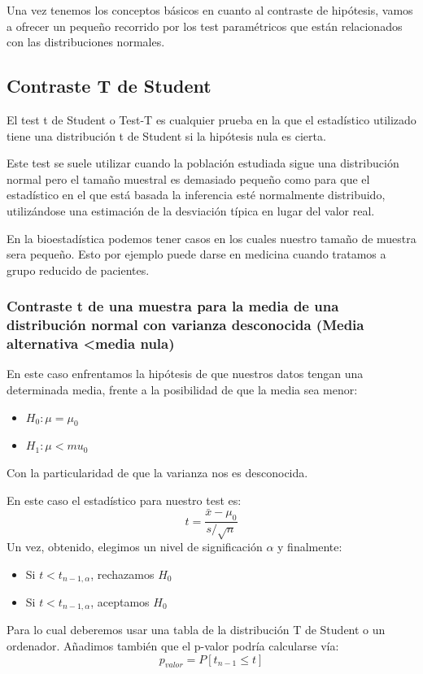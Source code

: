 \documentclass[a4paper,12pt]{article}
\begin{document}
Una vez tenemos los conceptos básicos en cuanto al contraste de hipótesis, vamos a ofrecer un pequeño recorrido por los test paramétricos que están relacionados con las distribuciones normales.


 \subsection{Contraste T de Student}
 El test t de Student o Test-T es cualquier prueba en la que el estadístico utilizado tiene una distribución t de Student si la hipótesis nula es cierta.
 
 Este test se suele utilizar cuando la población estudiada sigue una distribución normal pero el tamaño muestral es demasiado pequeño como para que el estadístico en el que está basada la inferencia esté normalmente distribuido, utilizándose una estimación de la desviación típica en lugar del valor real. 
 
 En la bioestadística podemos tener casos en los cuales nuestro tamaño de muestra sera pequeño. Esto por ejemplo puede darse en medicina cuando tratamos a grupo reducido de pacientes. 
 \subsubsection{Contraste t de una muestra para la media de una distribución normal con varianza desconocida (Media alternativa <media nula)}
 En este caso enfrentamos la hipótesis de que nuestros datos tengan una determinada media, frente a la posibilidad  de que la media sea menor: 
 \begin{itemize}
 	\item $H_0:\mu=\mu_0$
 	\item $H_1: \mu<mu_0$
 \end{itemize}
 Con la particularidad de que la varianza nos es desconocida.
 
 En este caso el estadístico para nuestro test es: 
 $$t=\frac{\bar{x}-\mu_0}{s/\sqrt{n}}$$
 Un vez, obtenido, elegimos un nivel de significación $\alpha$ y finalmente:
 \begin{itemize}
 	\item Si $t<t_{n-1,\alpha}$, rechazamos $H_0$
 	\item Si $t<t_{n-1,\alpha}$, aceptamos $H_0$
 \end{itemize}
 Para lo cual deberemos usar una tabla de la distribución T de Student o un ordenador.
 Añadimos también que el p-valor podría calcularse vía:
 $$p_{valor}=P[t_{n-1}\leq t]$$
 
\end{document}
